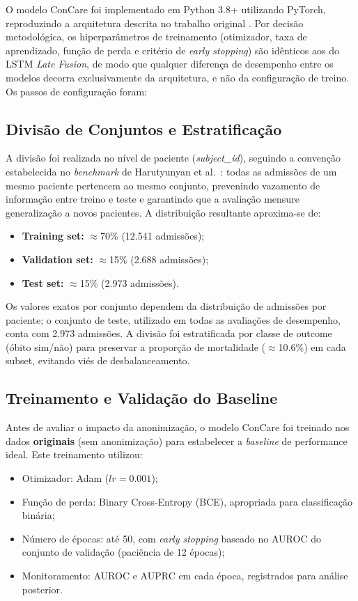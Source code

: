 O modelo ConCare foi implementado em Python 3.8+ utilizando PyTorch, reproduzindo a arquitetura descrita no trabalho original \cite{Ma2020}. Por decisão metodológica, os hiperparâmetros de treinamento (otimizador, taxa de aprendizado, função de perda e critério de \textit{early stopping}) são idênticos aos do LSTM \textit{Late Fusion}, de modo que qualquer diferença de desempenho entre os modelos decorra exclusivamente da arquitetura, e não da configuração de treino. Os passos de configuração foram:

\subsection{Divisão de Conjuntos e Estratificação}
A divisão foi realizada no nível de paciente (\textit{subject\_id}), seguindo a convenção estabelecida no \textit{benchmark} de Harutyunyan et al.\ \cite{Harutyunyan2019}: todas as admissões de um mesmo paciente pertencem ao mesmo conjunto, prevenindo vazamento de informação entre treino e teste e garantindo que a avaliação mensure generalização a novos pacientes. A distribuição resultante aproxima-se de:

\begin{itemize}
    \item \textbf{Training set:} $\approx$70\% (12.541 admissões);
    \item \textbf{Validation set:} $\approx$15\% (2.688 admissões);
    \item \textbf{Test set:} $\approx$15\% (2.973 admissões).
\end{itemize}

Os valores exatos por conjunto dependem da distribuição de admissões por paciente; o conjunto de teste, utilizado em todas as avaliações de desempenho, conta com 2.973 admissões. A divisão foi estratificada por classe de outcome (óbito sim/não) para preservar a proporção de mortalidade ($\approx$10.6\%) em cada subset, evitando viés de desbalanceamento.

\subsection{Treinamento e Validação do Baseline}
Antes de avaliar o impacto da anonimização, o modelo ConCare foi treinado nos dados \textbf{originais} (sem anonimização) para estabelecer a \textit{baseline} de performance ideal. Este treinamento utilizou:
\begin{itemize}
    \item Otimizador: Adam ($lr=0.001$);
    \item Função de perda: Binary Cross-Entropy (BCE), apropriada para classificação binária;
    \item Número de épocas: até 50, com \textit{early stopping} baseado no AUROC do conjunto de validação (paciência de 12 épocas);
    \item Monitoramento: AUROC e AUPRC em cada época, registrados para análise posterior.
\end{itemize}


